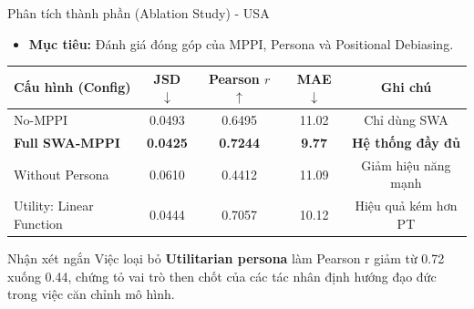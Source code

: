 \documentclass[11pt, aspectratio=169]{beamer}
\begin{document}
\begin{frame}{Phân tích thành phần (Ablation Study) - USA}
    \begin{itemize}
        \item \textbf{Mục tiêu:} Đánh giá đóng góp của MPPI, Persona và Positional Debiasing.
    \end{itemize}
    \begin{table}
    \centering \scriptsize
    \renewcommand{\arraystretch}{1.1}
    \begin{tabular}{l c c c c}
    \toprule
    \textbf{Cấu hình (Config)} & \textbf{JSD $\downarrow$} & \textbf{Pearson $r$ $\uparrow$} & \textbf{MAE $\downarrow$} & \textbf{Ghi chú} \\
    \midrule
    No-MPPI & 0.0493 & 0.6495 & 11.02 & Chỉ dùng SWA \\
    \textbf{Full SWA-MPPI} & \textbf{0.0425} & \textbf{0.7244} & \textbf{9.77} & \textbf{Hệ thống đầy đủ} \\
    \midrule
    Without Persona & 0.0610 & 0.4412 & 11.09 & \textcolor{alertred}{Giảm hiệu năng mạnh} \\
    Utility: Linear Function & 0.0444 & 0.7057 & 10.12 & Hiệu quả kém hơn PT \\
    \bottomrule
    \end{tabular}
    \end{table}
    \begin{block}{Nhận xét ngắn}
        Việc loại bỏ \textbf{Utilitarian persona} làm Pearson r giảm từ 0.72 xuống 0.44, chứng tỏ vai trò then chốt của các tác nhân định hướng đạo đức trong việc căn chỉnh mô hình.
    \end{block}
\end{frame}
\end{document}
